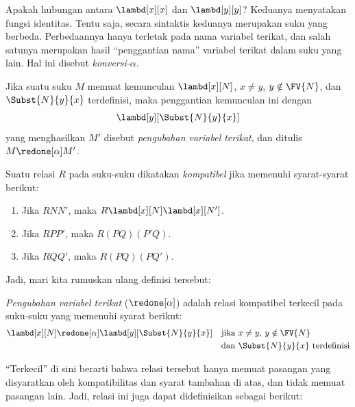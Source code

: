 \documentclass[../../../include/open-logic-section]{subfiles}
\begin{document}

Apakah hubungan antara $\lambd[x][x]$ dan $\lambd[y][y]$? Keduanya
menyatakan fungsi identitas. Tentu saja, secara sintaktis keduanya merupakan
suku yang berbeda. Perbedaannya hanya terletak pada nama variabel terikat, dan
salah satunya merupakan hasil ``penggantian nama'' variabel terikat dalam suku
yang lain. Hal ini disebut \emph{konversi-$\alpha$}.

\begin{defn}
  Jika suatu suku $M$ memuat kemunculan $\lambd[x][N]$, $x \neq y$,
  $y \notin \FV{N}$, dan $\Subst{N}{y}{x}$ terdefinisi, maka penggantian
  kemunculan ini dengan
  \begin{equation*}
    \lambd[y][\Subst{N}{y}{x}]
  \end{equation*}
  yang menghasilkan $M'$ disebut \emph{pengubahan variabel terikat}, dan
  ditulis $M \redone[\alpha] M'$.
\end{defn}

\begin{defn}
  Suatu relasi $R$ pada suku-suku dikatakan \emph{kompatibel}
  jika memenuhi syarat-syarat berikut:
  \begin{enumerate}
  \item Jika $R N N'$, maka $R \lambd[x][N] \lambd[x][N']$.
  \item Jika $R P P'$, maka $R (PQ) (P'Q)$.
  \item Jika $R Q Q'$, maka $R (PQ) (PQ')$.
  \end{enumerate}
\end{defn}

Jadi, mari kita rumuskan ulang definisi tersebut:
\begin{defn}
  \emph{Pengubahan variabel terikat} ($\redone[\alpha]$) adalah
  relasi kompatibel terkecil pada suku-suku yang memenuhi syarat berikut:
  \begin{align*}
    &\lambd[x][N] \redone[\alpha] \lambd[y][\Subst{N}{y}{x}] && \text{jika
      $x \neq y$, $y \notin \FV{N}$} \\
    & &&\text{dan $\Subst{N}{y}{x}$ terdefinisi}
  \end{align*}
\end{defn}

``Terkecil'' di sini berarti bahwa relasi tersebut hanya memuat pasangan yang
disyaratkan oleh kompatibilitas dan syarat tambahan di atas, dan tidak memuat
pasangan lain. Jadi, relasi ini juga dapat didefinisikan sebagai berikut:
\end{document}
